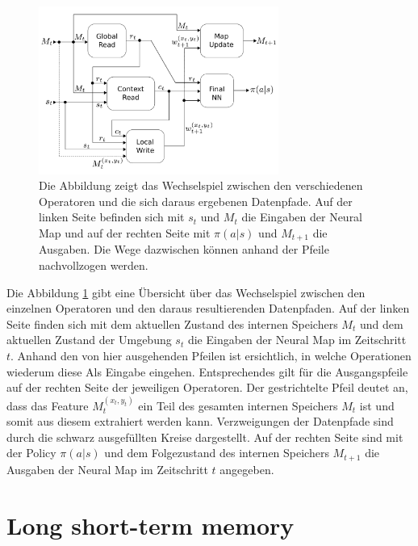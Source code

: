 \begin{figure}[ht!]
  \centering
  \includegraphics[keepaspectratio,width=0.7\textwidth]{abbildungen/neural_map.pdf}
  \caption{Die Abbildung zeigt das Wechselspiel zwischen den verschiedenen Operatoren und die sich daraus ergebenen Datenpfade. Auf der linken Seite befinden sich mit $s_t$ und $M_t$ die Eingaben der Neural Map und auf der rechten Seite mit $\pi(a|s)$ und $M_{t+1}$ die Ausgaben. Die Wege dazwischen können anhand der Pfeile nachvollzogen werden.}
  \label{fig_neural_map}
\end{figure}


Die Abbildung \ref{fig_neural_map} gibt eine Übersicht über das Wechselspiel zwischen den einzelnen Operatoren und den daraus resultierenden Datenpfaden. Auf der linken Seite finden sich mit dem aktuellen Zustand des internen Speichers $M_t$ und dem aktuellen Zustand der Umgebung $s_t$ die Eingaben der Neural Map im Zeitschritt $t$. Anhand den von hier ausgehenden Pfeilen ist ersichtlich, in welche Operationen wiederum diese Als Eingabe eingehen. Entsprechendes gilt für die Ausgangspfeile auf der rechten Seite der jeweiligen Operatoren. Der gestrichtelte Pfeil deutet an, dass das Feature $M_t^{(x_t,y_t)}$ ein Teil des gesamten internen Speichers $M_t$ ist und somit aus diesem extrahiert werden kann. Verzweigungen der Datenpfade sind durch die schwarz ausgefüllten Kreise dargestellt. Auf der rechten Seite sind mit der Policy $\pi(a|s)$ und dem Folgezustand des internen Speichers $M_{t+1}$ die Ausgaben der Neural Map im Zeitschritt $t$ angegeben.


\section{Long short-term memory}
\label{sec_lstm}

